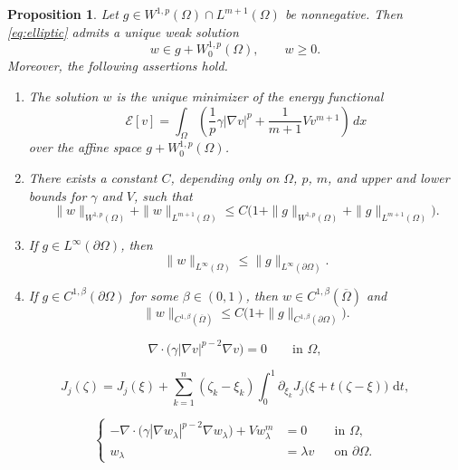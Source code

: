 \documentclass[10pt,a4paper]{amsart}
\newtheorem{prop}{Proposition}
\newcommand{\dd}{\,\mathrm{d}}
\newcommand{\pr}{\partial}
\begin{document}
\begin{prop}\label{prop:elliptic-forward}
Let $g\in W^{1,p}(\Omega)\cap L^{m+1}(\Omega)$ be nonnegative. Then \eqref{eq:elliptic} admits a unique weak solution
\[
w\in g+W^{1,p}_0(\Omega),\qquad w\ge0.
\]
Moreover, the following assertions hold.
\begin{enumerate}
\item The solution $w$ is the unique minimizer of the energy functional
\begin{equation}\label{eq:energy}
\mathcal E[v]
=\int_\Omega\left(\frac{1}{p}\gamma|\nabla v|^p+\frac{1}{m+1}Vv^{m+1}\right)\,dx
\end{equation}
over the affine space $g+W^{1,p}_0(\Omega)$.
\item There exists a constant $C$, depending only on $\Omega$, $p$, $m$, and upper and lower bounds for $\gamma$ and $V$, such that
\begin{equation}\label{eq:elliptic-energy-bound}
\|w\|_{W^{1,p}(\Omega)}+\|w\|_{L^{m+1}(\Omega)}
\le C\bigl(1+\|g\|_{W^{1,p}(\Omega)}+\|g\|_{L^{m+1}(\Omega)}\bigr).
\end{equation}
\item If $g\in L^\infty(\pr\Omega)$, then
\begin{equation}\label{eq:elliptic-max-principle}
\|w\|_{L^\infty(\Omega)}\le \|g\|_{L^\infty(\pr\Omega)}.
\end{equation}
\item If $g\in C^{1,\beta}(\pr\Omega)$ for some $\beta\in(0,1)$, then $w\in C^{1,\beta}(\overline\Omega)$ and
\begin{equation}\label{eq:lieberman-estimate}
\|w\|_{C^{1,\beta}(\overline\Omega)}
\le C\bigl(1+\|g\|_{C^{1,\beta}(\pr\Omega)}\bigr).
\end{equation}
\end{enumerate}
\end{prop}

\begin{equation}\label{eq:p-laplace}
\nabla\cdot\bigl(\gamma|\nabla v|^{p-2}\nabla v\bigr)=0
\qquad \text{in }\Omega,
\end{equation}

\begin{equation}\label{eq:Taylor-J}
J_j(\zeta)=J_j(\xi)+\sum_{k=1}^n(\zeta_k-\xi_k)\int_0^1 \partial_{\xi_k}J_j\bigl(\xi+t(\zeta-\xi)\bigr)\,\dd t,
\end{equation}

\begin{equation}\label{eq:w-lambda-small}
\left\{
\begin{aligned}
-\nabla\cdot\bigl(\gamma|\nabla w_\lambda|^{p-2}\nabla w_\lambda\bigr)+Vw_\lambda^m&=0 &&\text{in }\Omega,\\
 w_\lambda&=\lambda v &&\text{on }\pr\Omega.
\end{aligned}
\right.
\end{equation}
\end{document}
